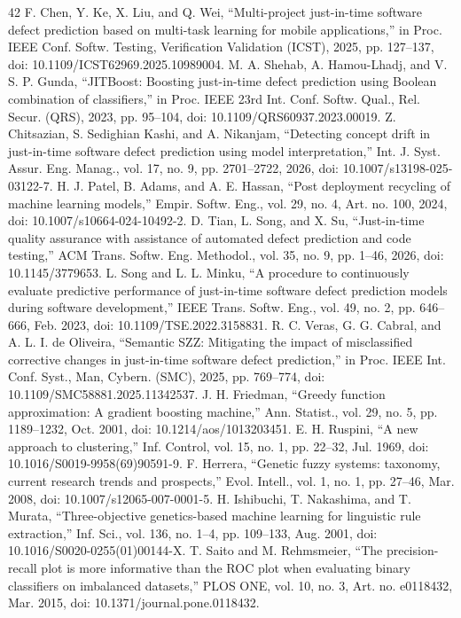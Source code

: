 \begin{thebibliography}{42}
 F. Chen, Y. Ke, X. Liu, and Q. Wei, ``Multi-project just-in-time software defect prediction based on multi-task learning for mobile applications,'' in Proc. IEEE Conf. Softw. Testing, Verification Validation (ICST), 2025, pp. 127--137, doi: \mbox{10.1109/ICST62969.2025.10989004}.
 M. A. Shehab, A. Hamou-Lhadj, and V. S. P. Gunda, ``JITBoost: Boosting just-in-time defect prediction using Boolean combination of classifiers,'' in Proc. IEEE 23rd Int. Conf. Softw. Qual., Rel. Secur. (QRS), 2023, pp. 95--104, doi: \mbox{10.1109/QRS60937.2023.00019}.
 Z. Chitsazian, S. Sedighian Kashi, and A. Nikanjam, ``Detecting concept drift in just-in-time software defect prediction using model interpretation,'' Int. J. Syst. Assur. Eng. Manag., vol. 17, no. 9, pp. 2701--2722, 2026, doi: \mbox{10.1007/s13198-025-03122-7}.
 H. J. Patel, B. Adams, and A. E. Hassan, ``Post deployment recycling of machine learning models,'' Empir. Softw. Eng., vol. 29, no. 4, Art. no. 100, 2024, doi: \mbox{10.1007/s10664-024-10492-2}.
 D. Tian, L. Song, and X. Su, ``Just-in-time quality assurance with assistance of automated defect prediction and code testing,'' ACM Trans. Softw. Eng. Methodol., vol. 35, no. 9, pp. 1--46, 2026, doi: \mbox{10.1145/3779653}.
 L. Song and L. L. Minku, ``A procedure to continuously evaluate predictive performance of just-in-time software defect prediction models during software development,'' IEEE Trans. Softw. Eng., vol. 49, no. 2, pp. 646--666, Feb. 2023, doi: \mbox{10.1109/TSE.2022.3158831}.
 R. C. Veras, G. G. Cabral, and A. L. I. de Oliveira, ``Semantic SZZ: Mitigating the impact of misclassified corrective changes in just-in-time software defect prediction,'' in Proc. IEEE Int. Conf. Syst., Man, Cybern. (SMC), 2025, pp. 769--774, doi: \mbox{10.1109/SMC58881.2025.11342537}.
 J. H. Friedman, ``Greedy function approximation: A gradient boosting machine,'' Ann. Statist., vol. 29, no. 5, pp. 1189--1232, Oct. 2001, doi: \mbox{10.1214/aos/1013203451}.
 E. H. Ruspini, ``A new approach to clustering,'' Inf. Control, vol. 15, no. 1, pp. 22--32, Jul. 1969, doi: \mbox{10.1016/S0019-9958(69)90591-9}.
 F. Herrera, ``Genetic fuzzy systems: taxonomy, current research trends and prospects,'' Evol. Intell., vol. 1, no. 1, pp. 27--46, Mar. 2008, doi: \mbox{10.1007/s12065-007-0001-5}.
 H. Ishibuchi, T. Nakashima, and T. Murata, ``Three-objective genetics-based machine learning for linguistic rule extraction,'' Inf. Sci., vol. 136, no. 1--4, pp. 109--133, Aug. 2001, doi: \mbox{10.1016/S0020-0255(01)00144-X}.
 T. Saito and M. Rehmsmeier, ``The precision-recall plot is more informative than the ROC plot when evaluating binary classifiers on imbalanced datasets,'' PLOS ONE, vol. 10, no. 3, Art. no. e0118432, Mar. 2015, doi: \mbox{10.1371/journal.pone.0118432}.
\end{thebibliography}
